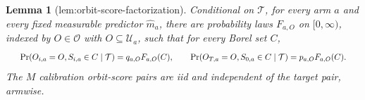 \documentclass{article}
\newtheorem{lemma}{Lemma}
\begin{document}
\begin{lemma}[lem:orbit-score-factorization]\label{lem:orbit-score-factorization}
Conditional on \(\mathcal T\), for every arm \(a\) and every fixed measurable predictor \(\widehat m_a\), there are probability laws \(F_{a,O}\) on \([0,\infty)\), indexed by \(O\in\mathcal O\) with \(O\subseteq\mathcal U_a\), such that for every Borel set \(C\), \[
\makebox[\linewidth][c]{\resizebox{0.98\linewidth}{!}{\par\noindent \makebox[\linewidth][c]{\resizebox{0.98\linewidth}{!}{\(\displaystyle \displaystyle \Pr(O_{i,a}=O,S_{i,a}\in C\mid\mathcal T)=q_{a,O}F_{a,O}(C),\qquad\Pr(O_{T,a}=O,S_{0,a}\in C\mid\mathcal T)=p_{a,O}F_{a,O}(C).\)}}\par\noindent}}
\] The \(M\) calibration orbit-score pairs are iid and independent of the target pair, armwise.
\end{lemma}
\end{document}
